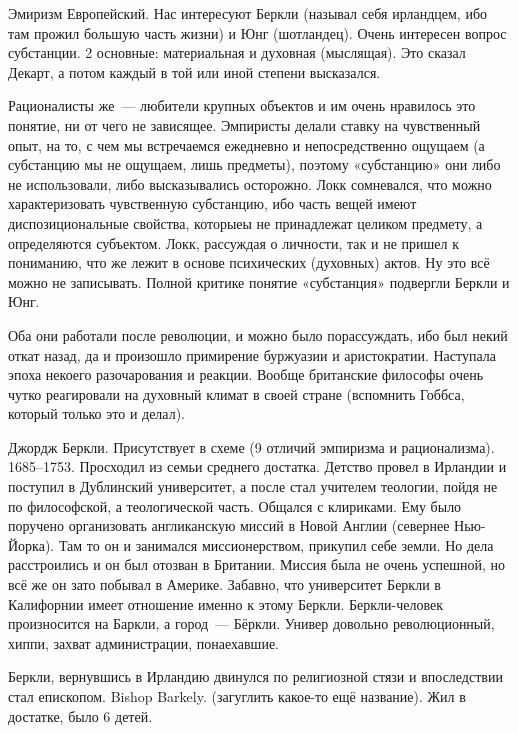 Эмиризм Европейский. Нас интересуют Беркли (называл себя ирландцем, ибо там прожил большую часть жизни) и Юнг (шотландец).
Очень интересен вопрос субстанции. 2 основные: материальная и духовная (мыслящая). Это сказал Декарт, а потом каждый в той или иной степени высказался. 

Рационалисты же~--- любители крупных объектов и им очень нравилось это понятие, ни от чего не зависящее. Эмпиристы делали ставку на чувственный опыт, на то, с чем мы встречаемся ежедневно и непосредственно ощущаем (а субстанцию мы не ощущаем, лишь предметы), поэтому «субстанцию» они либо не использовали, либо высказывались осторожно. 
Локк сомневался, что можно характеризовать чувственную субстанцию, ибо часть вещей имеют диспозициональные свойства, которыеы не принадлежат целиком предмету, а определяются субъектом. 
Локк, рассуждая о личности, так и не пришел к пониманию, что же лежит в основе психических (духовных) актов. Ну это всё можно не записывать. Полной критике понятие «субстанция» подвергли Беркли и Юнг.

Оба они работали после революции, и можно было порассуждать, ибо был некий откат назад, да и произошло примирение буржуазии и аристократии. Наступала эпоха некоего разочарования и реакции. Вообще британские философы очень чутко реагировали на духовный климат в своей стране (вспомнить Гоббса, который только это и делал). 

Джордж Беркли. Присутствует в схеме (9 отличий эмпиризма и рационализма). 1685--1753. Просходил из семьи среднего достатка. 
Детство провел в Ирландии и поступил в Дублинский университет, а после стал учителем теологии, пойдя не по философской, а теологической часть. Общался с клириками. 
Ему было поручено организовать англиканскую миссий в Новой Англии (севернее Нью-Йорка). Там то он и занимался миссионерством, прикупил себе земли. Но дела расстроились и он был отозван в Британии. Миссия была не очень успешной, но всё же он зато побывал в Америке. 
Забавно, что университет Беркли в Калифорнии имеет отношение именно к этому Беркли. Беркли-человек произносится на Баркли, а город~--- Бёркли. Универ довольно революционный, хиппи, захват администрации, понаехавшие. 

Беркли, вернувшись в Ирландию двинулся по религиозной стязи и впоследствии стал епископом. Bishop Barkely. (загуглить какое-то ещё название). Жил в достатке, было 6 детей.

